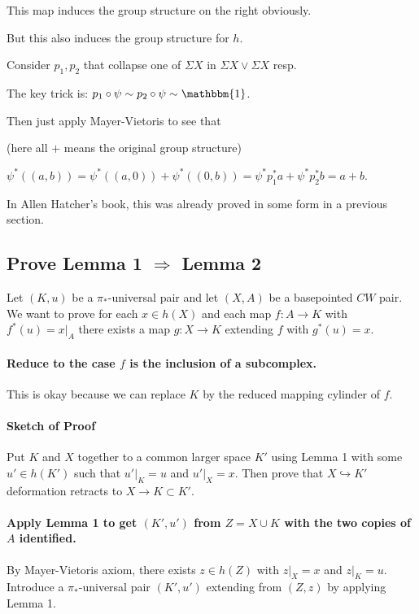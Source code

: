 \documentclass[11pt, oneside]{article}   	%
\theoremstyle{definition}
\begin{document}
This map induces the group structure on the right obviously.

But this also induces the group structure for $h$.

Consider $p_1, p_2$ that collapse one of $\Sigma X$ in $\Sigma X\vee \Sigma X$ resp.

The key trick is: $p_1\circ \psi\sim p_2\circ \psi\sim \mathbbm{1}$.

Then just apply Mayer-Vietoris to see that

(here all $+$ means the original group structure)

$\psi^*((a,b))=\psi^*((a,0))+\psi^*((0,b)) = \psi^* p_1^* a + \psi^* p_2^*b=a+b$.

In Allen Hatcher's book, this was already proved in some form in a previous section.

\subsection{Prove Lemma 1 $\Rightarrow$ Lemma 2}

Let $(K, u)$ be a $\pi_*$-universal pair and let $(X, A)$ be a basepointed $CW$ pair.
We want to prove for each $x\in h(X)$ and each map $f: A\to K$ with $f^*(u)=x|_A$ there exists a map $g:X\to K$ extending $f$ with $g^*(u)=x$.

\paragraph {Reduce to the case $f$ is the inclusion of a subcomplex.} This is okay because we can replace $K$ by the reduced mapping cylinder of $f$.

\paragraph {Sketch of Proof} Put $K$ and $X$ together to a common larger space $K'$ using Lemma 1 with some $u'\in h(K')$ such that $u'|_K=u$ and $u'|_X=x$. Then prove that $X\hookrightarrow K'$ deformation retracts to $X \to K\subset K'$.

\paragraph {Apply Lemma 1 to get $(K', u')$ from $Z=X\cup K$ with the two copies of $A$ identified.} By Mayer-Vietoris axiom, there exists $z\in h(Z)$ with $z|_X=x$ and $z|_K=u$. Introduce a $\pi_*$-universal pair $(K', u')$ extending from $(Z, z)$ by applying Lemma 1.
\end{document}
